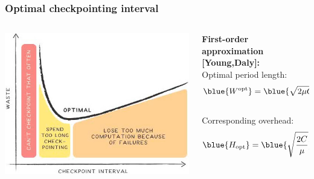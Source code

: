 \begin{frame}
\frametitle{Optimal checkpointing interval}

\begin{columns}
  \begin{column}{.6\linewidth}
    \begin{center}
      \includegraphics[width=\columnwidth]{resilience}
    \end{center}
  \end{column}
  \begin{column}{.4\linewidth}
    \small
    \textbf{First-order approximation [Young,Daly]:}\\
    Optimal period length:
    $$\blue{W^{\opt}} = \blue{\sqrt{2\mu C}}$$\\
    Corresponding overhead:
    $$\blue{H_{\text{opt}}} = \blue{\sqrt{\frac{2C}{\mu}}}$$
  \end{column}
\end{columns}

\end{frame}

